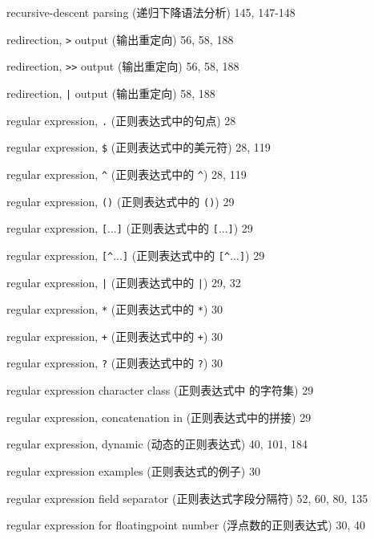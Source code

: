 \begin{multicols}{2}
\hangindent=2pc  recursive-descent parsing (递归下降语法分析) 145, 147-148

\hangindent=2pc  redirection, \verb'>' output (输出重定向) 56, 58, 188

\hangindent=2pc  redirection, \verb'>>' output (输出重定向) 56, 58, 188

\hangindent=2pc  redirection, \verb'|' output (输出重定向) 58, 188

\hangindent=2pc  regular expression, \verb'.'
(正则表达式中的句点) 28

\hangindent=2pc  regular expression, \verb'$'
(正则表达式中的美元符) 28, 119

\hangindent=2pc  regular expression, \verb'^' (正则表达式中的
\verb'^') 28, 119

\hangindent=2pc  regular expression, \verb'()' (正则表达式中的
\verb'()') 29

\hangindent=2pc  regular expression, \verb'['...\verb']'
(正则表达式中的 \verb'['...\verb']') 29

\hangindent=2pc  regular expression, \verb'[^'...\verb']'
(正则表达式中的 \verb'[^'...\verb']') 29

\hangindent=2pc  regular expression, \verb'|' (正则表达式中的
\verb'|') 29, 32

\hangindent=2pc  regular expression, \verb'*' (正则表达式中的
\verb'*') 30

\hangindent=2pc  regular expression, \verb'+' (正则表达式中的
\verb'+') 30

\hangindent=2pc  regular expression, \verb'?' (正则表达式中的
\verb'?') 30

\hangindent=2pc  regular expression character class (正则表达式中 
的字符集) 29

\hangindent=2pc  regular expression, concatenation in
(正则表达式中的拼接) 29

\hangindent=2pc  regular expression, dynamic (动态的正则表达式) 40, 101, 184

\hangindent=2pc  regular expression examples (正则表达式的例子) 30

\hangindent=2pc  regular expression field separator
(正则表达式字段分隔符) 52, 60, 80, 135

\hangindent=2pc  regular expression for floatingpoint number
(浮点数的正则表达式) 30, 40


\end{multicols}
